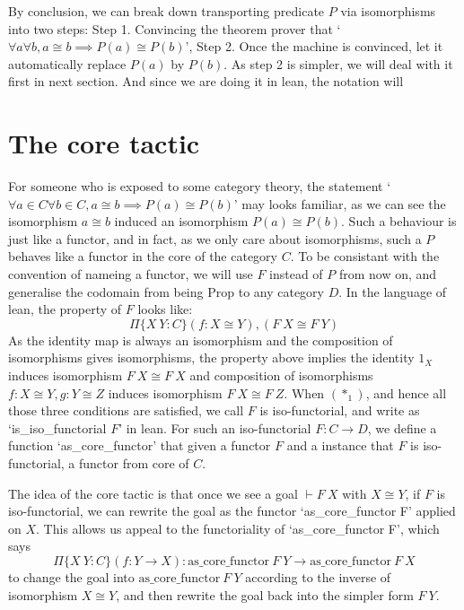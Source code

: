 \documentclass[11pt]{article}
\begin{document}
By conclusion, we can break down transporting predicate $P$ via isomorphisms into two steps: Step 1. Convincing the theorem prover that `$\forall a\forall b, a \cong b \implies P(a)\cong P(b)$', Step 2. Once the machine is convinced, let it automatically replace $P(a)$ by $P(b)$. As step 2 is simpler, we will deal with it first in next section. And since we are doing it in lean, the notation will 

\section{The core tactic}

For someone who is exposed to some category theory, the statement `$\forall a\in C\forall b\in C, a \cong b \implies P(a)\cong P(b)$' may looks familiar, as we can see the isomorphism $a\cong b$ induced an isomorphism $P(a)\cong P(b)$. Such a behaviour is just like a functor, and in fact, as we only care about isomorphisms, such a $P$ behaves like a functor in the core of the category $C$. To be consistant with the convention of nameing a functor, we will use $F$ instead of $P$ from now on, and generalise the codomain from being $\text{Prop}$ to any category $D$. In the language of lean, the property of $F$ looks like:
\[\Pi \{X \ Y : C\} (f : X\cong Y), (F \  X \cong F \ Y)\]
As the identity map is always an isomorphism and the composition of isomorphisms gives isomorphisms, the property above implies the identity $1_X$ induces isomorphism $F \ X \cong F \ X$ and composition of isomorphisms $f: X \cong Y,g: Y \cong Z$ induces isomorphism $F \ X \cong F \ Z$. When $(*_1)$, and hence all those three conditions are satisfied, we call $F$ is iso-functorial, and write as `is\_iso\_functorial $F$' in lean. For such an iso-functorial $F : C \to D$, we define a function `as\_core\_functor' that given a functor $F$ and a instance that $F$ is iso-functorial, a functor from core of $C$.

The idea of the core tactic is that once we see a goal $\vdash F \ X$ with $X\cong Y$, if $F$ is iso-functorial, we can rewrite the goal as the functor `as\_core\_functor F' applied on $X$. This allows us appeal to the functoriality of `as\_core\_functor F', which says 
\[\Pi \{X \ Y : C\} (f:Y \longrightarrow X) : \text{as\_core\_functor} \  F \ Y \longrightarrow \text{as\_core\_functor} \ F \ X \] 
to change the goal into $\text{as\_core\_functor} \  F \ Y$ according to the inverse of isomorphism $X\cong Y$, and then rewrite the goal back into the simpler form $F \ Y$.
\end{document}

